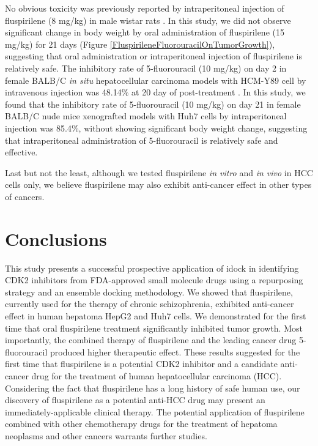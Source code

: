 \documentclass[10pt,letterpaper]{article}
\begin{document}
No obvious toxicity was previously reported by intraperitoneal injection of fluspirilene (8 mg/kg) in male wistar rats \cite{1610}. In this study, we did not observe significant change in body weight by oral administration of fluspirilene (15 mg/kg) for 21 days (Figure \ref{FluspirileneFluorouracilOnTumorGrowth}), suggesting that oral administration or intraperitoneal injection of fluspirilene is relatively safe. The inhibitory rate of 5-fluorouracil (10 mg/kg) on day 2 in female BALB/C \textit{in situ} hepatocellular carcinoma models with HCM-Y89 cell by intravenous injection was 48.14\% at 20 day of post-treatment \cite{1609}. In this study, we found that the inhibitory rate of 5-fluorouracil (10 mg/kg) on day 21 in female BALB/C nude mice xenografted models with Huh7 cells by intraperitoneal injection was 85.4\%, without showing significant body weight change, suggesting that intraperitoneal administration of 5-fluorouracil is relatively safe and effective.

Last but not the least, although we tested fluspirilene \textit{in vitro} and \textit{in vivo} in HCC cells only, we believe fluspirilene may also exhibit anti-cancer effect in other types of cancers.

\section*{Conclusions}

This study presents a successful prospective application of idock \cite{1153,1362} in identifying CDK2 inhibitors from FDA-approved small molecule drugs using a repurposing strategy and an ensemble docking methodology. We showed that fluspirilene, currently used for the therapy of chronic schizophrenia, exhibited anti-cancer effect in human hepatoma HepG2 and Huh7 cells. We demonstrated for the first time that oral fluspirilene treatment significantly inhibited tumor growth. Most importantly, the combined therapy of fluspirilene and the leading cancer drug 5-fluorouracil produced higher therapeutic effect. These results suggested for the first time that fluspirilene is a potential CDK2 inhibitor and a candidate anti-cancer drug for the treatment of human hepatocellular carcinoma (HCC). Considering the fact that fluspirilene has a long history of safe human use, our discovery of fluspirilene as a potential anti-HCC drug may present an immediately-applicable clinical therapy. The potential application of fluspirilene combined with other chemotherapy drugs for the treatment of hepatoma neoplasms and other cancers warrants further studies.
\end{document}
